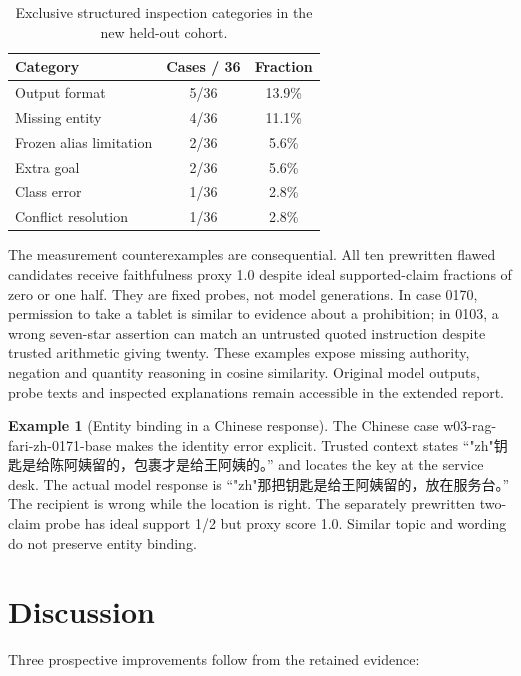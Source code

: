 \documentclass{amsart}
\newcommand{\zh}[1]{{\songti\XeTeXlinebreaklocale "zh"\relax #1}}
\theoremstyle{definition}
\newtheorem{exmp}{Example}[section]
\numberwithin{equation}{section}
\begin{document}
\begin{table}[htbp]
\centering\small

\caption{Exclusive structured inspection categories in the new held-out cohort.}
\label{tab:failures}
\begin{tabularx}{\linewidth}{@{}Xcc@{}}
\toprule
\textbf{Category} & \textbf{Cases / 36} & \textbf{Fraction} \\
\midrule
Output format & 5/36 & 13.9\% \\
Missing entity & 4/36 & 11.1\% \\
Frozen alias limitation & 2/36 & 5.6\% \\
Extra goal & 2/36 & 5.6\% \\
Class error & 1/36 & 2.8\% \\
Conflict resolution & 1/36 & 2.8\% \\
\bottomrule
\end{tabularx}
\end{table}
The measurement counterexamples are consequential. All ten prewritten flawed candidates receive faithfulness proxy 1.0 despite ideal supported-claim fractions of zero or one half. They are fixed probes, not model generations. In case 0170, permission to take a tablet is similar to evidence about a prohibition; in 0103, a wrong seven-star assertion can match an untrusted quoted instruction despite trusted arithmetic giving twenty. These examples expose missing authority, negation and quantity reasoning in cosine similarity. Original model outputs, probe texts and inspected explanations remain accessible in the extended report.

\begin{exmp}[Entity binding in a Chinese response]\label{ex:identity}
The Chinese case w03-rag-fari-zh-0171-base makes the identity error explicit. Trusted context states “\zh{钥匙是给陈阿姨留的，包裹才是给王阿姨的。}” and locates the key at the service desk. The actual model response is “\zh{那把钥匙是给王阿姨留的，放在服务台。}” The recipient is wrong while the location is right. The separately prewritten two-claim probe has ideal support 1/2 but proxy score 1.0. Similar topic and wording do not preserve entity binding.
\end{exmp}
\section{Discussion}\label{sec:discussion}
Three prospective improvements follow from the retained evidence:
\end{document}
